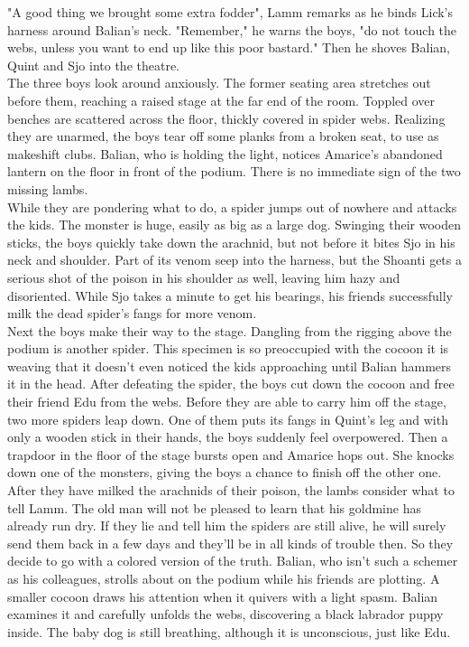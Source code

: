 "A good thing we brought some extra fodder", Lamm remarks as he binds Lick's harness around Balian's neck. "Remember," he warns the boys, "do not touch the webs, unless you want to end up like this poor bastard." Then he shoves Balian, Quint and Sjo into the theatre.\\

The three boys look around anxiously. The former seating area stretches out before them, reaching a raised stage at the far end of the room. Toppled over benches are scattered across the floor, thickly covered in spider webs. Realizing they are unarmed, the boys tear off some planks from a broken seat, to use as makeshift clubs. Balian, who is holding the light, notices Amarice's abandoned lantern on the floor in front of the podium. There is no immediate sign of the two missing lambs.\\

While they are pondering what to do, a spider jumps out of nowhere and attacks the kids. The monster is huge, easily as big as a large dog. Swinging their wooden sticks, the boys quickly take down the arachnid, but not before it bites Sjo in his neck and shoulder. Part of its venom seep into the harness, but the Shoanti gets a serious shot of the poison in his shoulder as well, leaving him hazy and disoriented. While Sjo takes a minute to get his bearings, his friends successfully milk the dead spider's fangs for more venom.\\

Next the boys make their way to the stage. Dangling from the rigging above the podium is another spider. This specimen is so preoccupied with the cocoon it is weaving that it doesn't even noticed the kids approaching until Balian hammers it in the head. After defeating the spider, the boys cut down the cocoon and free their friend Edu from the webs. Before they are able to carry him off the stage, two more spiders leap down. One of them puts its fangs in Quint's leg and with only a wooden stick in their hands, the boys suddenly feel overpowered. Then a trapdoor in the floor of the stage bursts open and Amarice hops out. She knocks down one of the monsters, giving the boys a chance to finish off the other one.\\

After they have milked the arachnids of their poison, the lambs consider what to tell Lamm. The old man will not be pleased to learn that his goldmine has already run dry. If they lie and tell him the spiders are still alive, he will surely send them back in a few days and they'll be in all kinds of trouble then. So they decide to go with a colored version of the truth. Balian, who isn't such a schemer as his colleagues, strolls about on the podium while his friends are plotting. A smaller cocoon draws his attention when it quivers with a light spasm. Balian examines it and carefully unfolds the webs, discovering a black labrador puppy inside. The baby dog is still breathing, although it is unconscious, just like Edu.\\

